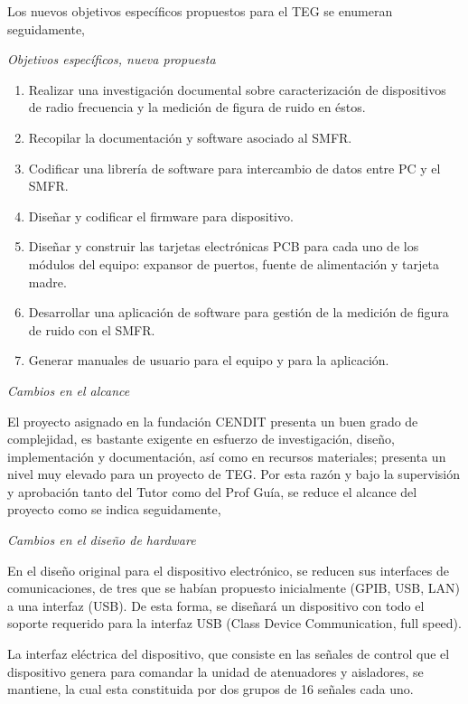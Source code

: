\documentclass[paper=letter,oneside,fontsize=12pt, parskip=full]{article}
\begin{document}
	Los nuevos objetivos específicos propuestos para el TEG se enumeran seguidamente,
	
	\emph{Objetivos específicos, nueva propuesta}
		
	\begin{enumerate}
		\item Realizar una investigación documental sobre caracterización de dispositivos de radio frecuencia y la medición de figura de ruido en éstos.
		
		\item Recopilar la documentación y software asociado al SMFR.
		
		\item Codificar una librería de software para intercambio de datos entre PC y el SMFR.
		
		\item Diseñar y codificar el firmware para dispositivo.
		
		\item Diseñar y construir las tarjetas electrónicas PCB para cada uno de los módulos del equipo: expansor de puertos, fuente de alimentación y tarjeta madre.
		
		\item Desarrollar una aplicación de software para gestión de la medición de figura de ruido con el SMFR.
		
		\item Generar manuales de usuario para el equipo y para la aplicación.
	\end{enumerate}		

	\emph{Cambios en el alcance}
	
	El proyecto asignado en la fundación CENDIT presenta un buen grado de complejidad, es bastante exigente en esfuerzo de investigación, diseño, implementación y documentación, así como en recursos materiales; presenta un nivel muy elevado para un proyecto de TEG. Por esta razón y bajo la supervisión y aprobación tanto del Tutor como del Prof Guía, se reduce el alcance del proyecto como se indica seguidamente,
	
	\emph{Cambios en el diseño de hardware}

	En el diseño original para el dispositivo electrónico, se reducen sus  interfaces de comunicaciones, de tres que se habían propuesto inicialmente (GPIB, USB, LAN) a una interfaz (USB). De esta forma, se diseñará un dispositivo con todo el soporte requerido para la interfaz USB (Class Device Communication, full speed).			

	La interfaz eléctrica del dispositivo, que consiste en las señales de control que el dispositivo genera para comandar la unidad de atenuadores y aisladores, se mantiene, la cual esta constituida por dos grupos de 16 señales cada uno. 
	
\end{document}
